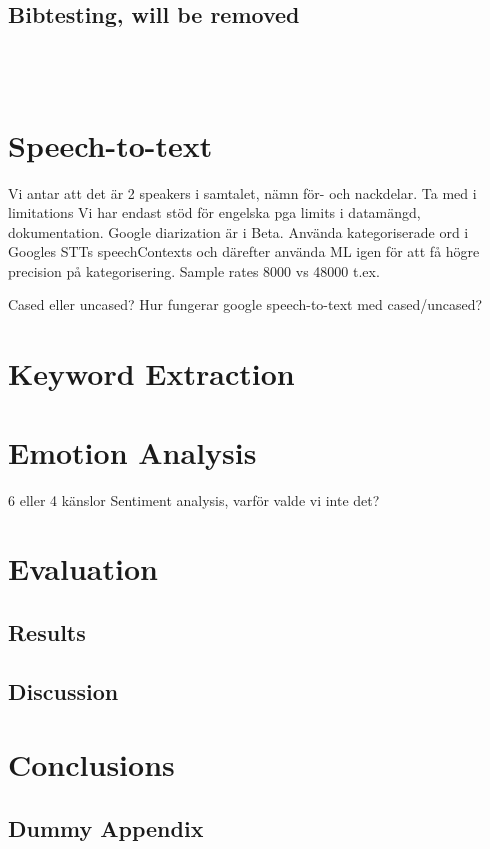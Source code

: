 \documentclass[nofilelist]{cslthse-msc}
\begin{document}
\section{Bibtesting, will be removed}
\citep{emotionlinesdataset} \\
\citep{franoischollet2017learning}\\
\citep{beaver2020towards}
\chapter{Speech-to-text}
Vi antar att det är 2 speakers i samtalet, nämn för- och nackdelar. Ta med i limitations
Vi har endast stöd för engelska pga limits i datamängd, dokumentation. 
Google diarization är i Beta.
Använda kategoriserade ord i Googles STTs speechContexts och därefter använda ML igen för att få högre precision på kategorisering. 
Sample rates 8000 vs 48000 t.ex.

Cased eller uncased? Hur fungerar google speech-to-text med cased/uncased?

\chapter{Keyword Extraction}
\chapter{Emotion Analysis}
6 eller 4 känslor
Sentiment analysis, varför valde vi inte det?


\chapter{Evaluation}

\section{Results}
\section{Discussion}


\chapter{Conclusions}



{}

\begin{appendices}
\chapter{Dummy Appendix}






\printfilelist

\checkoddpage
\ifoddpage
\else
   \newpage
   \thispagestyle{empty}
   \mbox{ }
\fi

\end{appendices}
\end{document}

